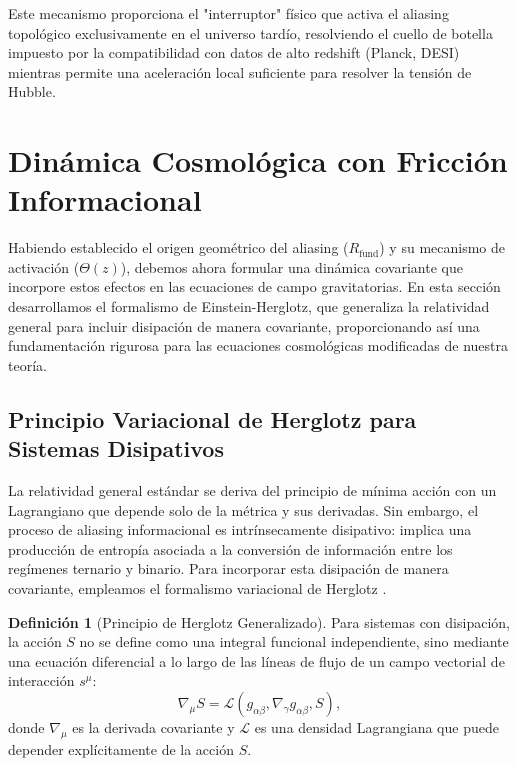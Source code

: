 \documentclass[12pt, a4paper]{article}
\theoremstyle{plain}
\theoremstyle{definition}
\newtheorem{definicion}{Definición}
\begin{document}
Este mecanismo proporciona el "interruptor" físico que activa el aliasing topológico exclusivamente en el universo tardío, resolviendo el cuello de botella impuesto por la compatibilidad con datos de alto redshift (Planck, DESI) mientras permite una aceleración local suficiente para resolver la tensión de Hubble.

\section{Dinámica Cosmológica con Fricción Informacional}
\label{sec:dinamica}

Habiendo establecido el origen geométrico del aliasing ($R_{\text{fund}}$) y su mecanismo de activación ($\Theta(z)$), debemos ahora formular una dinámica covariante que incorpore estos efectos en las ecuaciones de campo gravitatorias. En esta sección desarrollamos el formalismo de Einstein-Herglotz, que generaliza la relatividad general para incluir disipación de manera covariante, proporcionando así una fundamentación rigurosa para las ecuaciones cosmológicas modificadas de nuestra teoría.

\subsection{Principio Variacional de Herglotz para Sistemas Disipativos}

La relatividad general estándar se deriva del principio de mínima acción con un Lagrangiano que depende solo de la métrica y sus derivadas. Sin embargo, el proceso de aliasing informacional es intrínsecamente disipativo: implica una producción de entropía asociada a la conversión de información entre los regímenes ternario y binario. Para incorporar esta disipación de manera covariante, empleamos el formalismo variacional de Herglotz \cite{Herglotz1930, Lazo2017}.

\begin{definicion}[Principio de Herglotz Generalizado]
Para sistemas con disipación, la acción $S$ no se define como una integral funcional independiente, sino mediante una ecuación diferencial a lo largo de las líneas de flujo de un campo vectorial de interacción $s^\mu$:
\begin{equation}
\nabla_\mu S = \mathcal{L}(g_{\alpha\beta}, \nabla_\gamma g_{\alpha\beta}, S),
\label{eq:herglotz_definition}
\end{equation}
donde $\nabla_\mu$ es la derivada covariante y $\mathcal{L}$ es una densidad Lagrangiana que puede depender explícitamente de la acción $S$.
\end{definicion}
\end{document}
